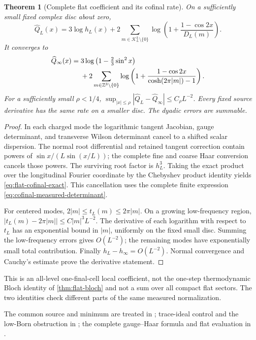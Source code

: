 \documentclass[11pt,oneside,openany]{book}
\newtheorem{theorem}{Theorem}[chapter]
\theoremstyle{definition}
\theoremstyle{remark}
\newcommand{\Z}{\mathbb Z}
\newcommand{\src}[2]{\cite[#2]{#1}}
\newcommand{\sourcebasis}[1]{\par\smallskip\noindent #1\par}
\begin{document}
\begin{theorem}[Complete flat coefficient and its cofinal rate]
\label{thm:cofinal-flat}
On a sufficiently small fixed complex disc about zero,
\begin{equation}
 \widehat Q_L(x)=3\log h_L(x)+
 2\sum_{m\in\mathcal K_L^3\setminus\{0\}}
       \log\left(1+\frac{1-\cos2x}{D_L(m)}\right).
 \label{eq:flat-cofinal-exact}
\end{equation}
It converges to
\begin{align}
 \widehat Q_\infty(x)={}&3\log\left(1-\tfrac23\sin^2x\right)\notag\\
 &+2\sum_{m\in\Z^3\setminus\{0\}}
 \log\left(1+\frac{1-\cos2x}{\cosh(2\pi|m|)-1}\right).
 \label{eq:flat-cofinal-limit}
\end{align}
For a sufficiently small $\rho<1/4$,
$\sup_{|x|\le\rho}|\widehat Q_L-\widehat Q_\infty|
\le C_\rho L^{-2}$. Every fixed source derivative has the same rate
on a smaller disc. The dyadic errors are summable.
\end{theorem}
\begin{proof}
In each charged mode the logarithmic tangent Jacobian, gauge
determinant, and transverse Wilson determinant cancel to a shifted
scalar dispersion. The normal root differential and retained tangent
correction contain powers of
$\sin x/(L\sin(x/L))$; the complete fine and coarse Haar conversion
cancels those powers. The surviving root factor is $h_L^3$.
Taking the exact product over the longitudinal Fourier coordinate
by the Chebyshev product identity yields
\cref{eq:flat-cofinal-exact}. This cancellation uses the complete
finite expression \cref{eq:cofinal-measured-determinant}.

For centered modes, $2|m|\le t_L(m)\le2\pi|m|$. On a growing
low-frequency region,
$|t_L(m)-2\pi|m||\le C|m|^3L^{-2}$.
The derivative of each logarithm with respect to $t_L$ has an
exponential bound in $|m|$, uniformly on the fixed small disc.
Summing the low-frequency errors gives $O(L^{-2})$; the remaining
modes have exponentially small total contribution. Finally
$h_L-h_\infty=O(L^{-2})$. Normal convergence and Cauchy's estimate
prove the derivative statement.
\end{proof}
This is an all-level one-final-cell local coefficient, not the
one-step thermodynamic Bloch identity of \cref{thm:flat-bloch} and not
a sum over all compact flat sectors. The two identities check different
parts of the same measured normalization.
\sourcebasis{The common source and minimum are treated in
\src{SM}{V12--V14}; trace-ideal control and the low-Born obstruction in
\src{SM}{V15}; the complete gauge--Haar formula and flat evaluation in
\src{SM}{V16}.}
\end{document}
